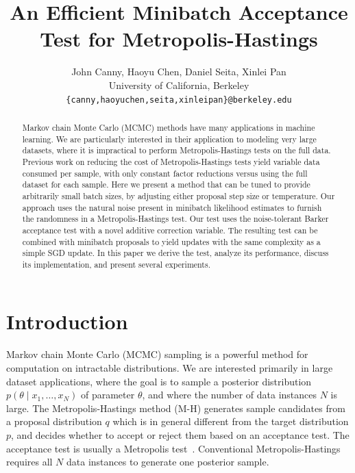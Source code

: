 \documentclass{article}
\title{An Efficient Minibatch Acceptance Test for Metropolis-Hastings}
\author{
  John Canny, Haoyu Chen, Daniel Seita, Xinlei Pan \\
  University of California, Berkeley \\
  \texttt{\{canny,haoyuchen,seita,xinleipan\}@berkeley.edu}
 }
\begin{document}
\maketitle

\begin{abstract}
Markov chain Monte Carlo (MCMC) methods have many applications in
machine learning. We are particularly interested in their application
to modeling very large datasets, where it is impractical to perform
Metropolis-Hastings tests on the full data. Previous work on reducing
the cost of Metropolis-Hastings tests yield variable data consumed per
sample, with only constant factor reductions versus using the full
dataset for each sample.  Here we present a method that can be tuned
to provide arbitrarily small batch sizes, by adjusting either proposal
step size or temperature. Our approach uses the natural noise present
in minibatch likelihood estimates to furnish the randomness in a
Metropolis-Hastings test. Our test uses the noise-tolerant Barker
acceptance test with a novel additive correction variable.  The
resulting test can be combined with minibatch proposals to yield
updates with the same complexity as a simple SGD update. In this paper
we derive the test, analyze its performance, discuss its
implementation, and present several experiments.
\end{abstract}



\section{Introduction}\label{sec:introduction}

Markov chain Monte Carlo (MCMC) sampling is a powerful method for
computation on intractable distributions. We are interested primarily
in large dataset applications, where the goal is to sample a posterior
distribution $p(\theta \mid x_1, \ldots, x_N)$ of parameter $\theta$,
and where the number of data instances $N$ is large.  The
Metropolis-Hastings method (M-H) generates sample candidates from a
proposal distribution $q$ which is in general different from the
target distribution $p$, and decides whether to accept or reject them
based on an acceptance test. The acceptance test is usually a
Metropolis test~\cite{Metropolis1953,hastings70}. Conventional
Metropolis-Hastings requires all $N$ data instances to generate one
posterior sample.
\end{document}
